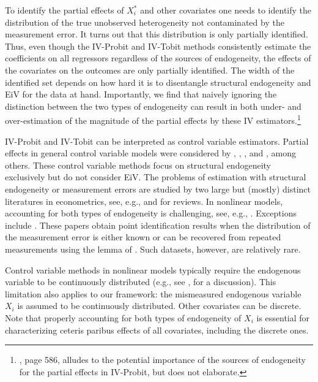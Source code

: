 \documentclass[12pt]{article}
\begin{document}
To identify the partial effects of $X_{i}^{\ast }$ and other covariates one
needs to identify the distribution of the true unobserved heterogeneity not
contaminated by the measurement error. It turns out that this distribution
is only partially identified. Thus, even though the IV-Probit and IV-Tobit
methods consistently estimate the coefficients on all regressors regardless
of the sources of endogeneity, the effects of the covariates on the outcomes
are only partially identified. The width of the identified set depends on
how hard it is to disentangle structural endogeneity and EiV for the data at
hand. Importantly, we find that naively ignoring the distinction between the
two types of endogeneity can result in both under- and over-estimation of
the magnitude of the partial effects by these IV estimators.\footnote{\cite%
{Wooldridge2010Book}, page 586, alludes to the potential importance of the
sources of endogeneity for the partial effects in IV-Probit, but does not
elaborate.}

IV-Probit and IV-Tobit can be interpreted as control variable estimators.
Partial effects in general control variable models were considered by \cite%
{BlundellPowell2003Advances}, \cite{Chesher2003Ecta}, \cite%
{ImbensNewey2009Ecta}, and \cite{Wooldridge2005APE,Wooldridge2015JHR}, among
others. These control variable methods focus on structural endogeneity
exclusively but do not consider EiV. The problems of estimation with
structural endogeneity or measurement errors are studied by two large but
(mostly) distinct literatures in econometrics, see, e.g., \cite%
{Matzkin2013AnnRev} and \cite{Schennach2020HB-ME} for reviews. In nonlinear
models, accounting for both types of endogeneity is challenging, see, e.g., 
\cite{Schennach2022JEcLit}. Exceptions include \cite%
{AdusumilliOtsu2018ET,SongSchennachWhite2015QE,SchennachWhiteChalak2012JoE,HahnRidder2017JoE}%
. These papers obtain point identification results when the distribution of
the measurement error is either known or can be recovered from repeated
measurements using the lemma of \cite{Kotlarski1967}. Such datasets,
however, are relatively rare.

Control variable methods in nonlinear models typically require the endogenous variable to be continuously distributed (e.g., see \citealp{ImbensNewey2009Ecta}, for a discussion). This limitation also applies to our framework: the mismeasured endogenous variable $X_i$ is assumed to be continuously distributed. Other covariates can be discrete. Note that properly accounting for both types of endogeneity of $X_i$ is essential for characterizing ceteris paribus effects of all covariates, including the discrete ones.
\end{document}

